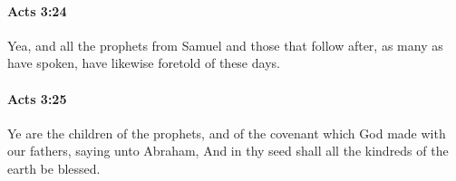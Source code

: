 		\paragraph{Acts 3:24} %
			\label{ACTS-3-24}

			Yea, and all the prophets from Samuel and those that follow after, as many as have spoken, have likewise foretold of these days.

			\begin{framed}
			\scriptsize
				\begin{compactdesc}
					\item[SBLG] 
				\end{compactdesc}
			\end{framed}

		\paragraph{Acts 3:25} %
			\label{ACTS-3-25}

			Ye are the children of the prophets, and of the covenant which God made with our fathers, saying unto Abraham, And in thy seed shall all the kindreds of the earth be blessed.

